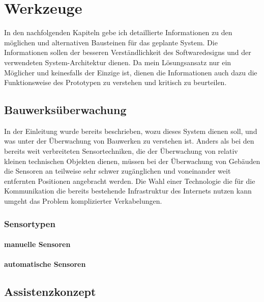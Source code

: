 \chapter{Werkzeuge}
In den nachfolgenden Kapiteln gebe ich detaillierte Informationen zu den möglichen und alternativen Bausteinen für das geplante System. Die Informationen sollen der besseren Verständlichkeit des Softwaredesigns und der verwendeten System-Architektur dienen. Da mein Lösungsansatz nur ein Möglicher und keinesfalls der Einzige ist, dienen die Informationen auch dazu die Funktionsweise des Prototypen zu verstehen und kritisch zu beurteilen.


\section{Bauwerksüberwachung}
In der Einleitung wurde bereits beschrieben, wozu dieses System dienen soll, und was unter der Überwachung von Bauwerken zu verstehen ist. Anders als bei den bereits weit verbreiteten Sensortechniken, die der Überwachung von relativ kleinen technischen Objekten dienen, müssen bei der Überwachung von Gebäuden die Sensoren an teilweise sehr schwer zugänglichen und voneinander weit entfernten Positionen angebracht werden. Die Wahl einer Technologie die für die Kommunikation die bereits bestehende Infrastruktur des Internets nutzen kann umgeht das Problem komplizierter Verkabelungen.

\subsection{Sensortypen}
\subsubsection{manuelle Sensoren}
\subsubsection{automatische Sensoren}


\section{Assistenzkonzept}


